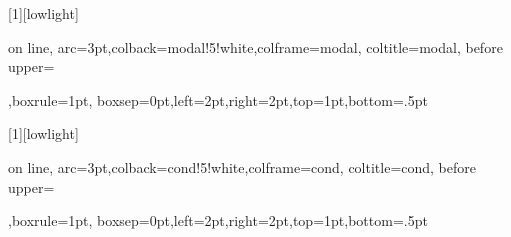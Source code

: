 	\newtcbox{\mhl}[1][lowlight]{on line,
	arc=3pt,colback=modal!5!white,colframe=modal,
	coltitle=modal,
	before upper={\rule[-3pt]{0pt}{10pt}},boxrule=1pt,
	boxsep=0pt,left=2pt,right=2pt,top=1pt,bottom=.5pt}

	\newtcbox{\chl}[1][lowlight]{on line,
	arc=3pt,colback=cond!5!white,colframe=cond,
	coltitle=cond,
	before upper={\rule[-3pt]{0pt}{10pt}},boxrule=1pt,
	boxsep=0pt,left=2pt,right=2pt,top=1pt,bottom=.5pt}


	\usepackage{linguex}
	\usepackage{booktabs}
	\usepackage[round]{natbib}
	\usepackage{multirow}
	\usepackage{rotating}


\usepackage{tikz}

	\usepackage{pifont}%
	\newcommand{\cmark}{\ding{51}}%
	\newcommand{\xmark}{\ding{55}}%


